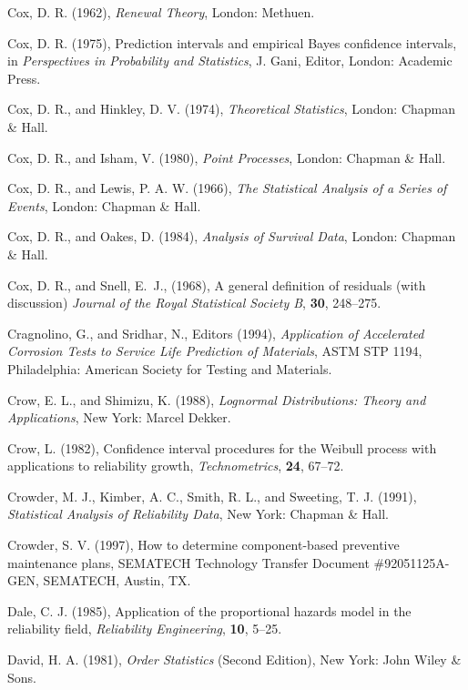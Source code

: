 \begin{thebibliography}{999}
Cox, D. R.  (1962), {\em Renewal Theory}, London: Methuen.

Cox, D. R. (1975), Prediction intervals and empirical Bayes
confidence intervals, in {\em Perspectives in Probability and
Statistics}, J. Gani, Editor, London: Academic Press.

Cox, D. R., and Hinkley, D. V. (1974), {\em Theoretical Statistics},
London: Chapman \& Hall.

Cox, D. R., and Isham, V. (1980), {\em Point Processes},
London: Chapman \&  Hall.

Cox, D. R., and Lewis, P. A. W. (1966), {\em The Statistical Analysis
of a Series of Events}, London: Chapman \& Hall.

Cox, D. R., and Oakes, D. (1984), {\em Analysis of Survival Data},
London: Chapman \& Hall.

Cox, D. R., and Snell, E.\ J., (1968), A general definition of
residuals (with discussion) {\em Journal of the Royal Statistical
Society B}, {\bf 30}, 248--275.


Cragnolino, G., and Sridhar, N., Editors (1994), {\em Application of
Accelerated Corrosion Tests to Service Life Prediction of Materials},
ASTM STP 1194, Philadelphia: American Society for Testing and Materials.

Crow, E. L., and Shimizu, K. (1988), {\em Lognormal Distributions:
Theory and Applications}, New York: Marcel Dekker.

Crow, L. (1982), Confidence interval procedures for the Weibull
process with applications to reliability growth, {\em Technometrics},
{\bf 24}, 67--72.

Crowder, M. J., Kimber, A. C., Smith, R. L., and Sweeting, T. J.
(1991), {\em Statistical Analysis of Reliability Data}, New York:
Chapman \& Hall.

Crowder, S. V. (1997), How to determine component-based preventive
maintenance plans, SEMATECH Technology Transfer Document
\#92051125A-GEN, SEMATECH, Austin, TX.

Dale, C. J. (1985), Application of the proportional hazards model in
the reliability field, {\em Reliability Engineering}, {\bf 10}, 5--25.

David, H. A. (1981), {\em Order Statistics} (Second Edition), New
York: John Wiley \& Sons.


\end{thebibliography}

